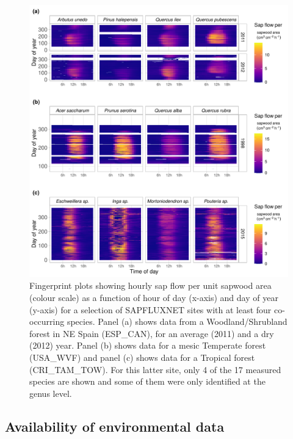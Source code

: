 \documentclass[11pt,twoside]{reedthesis}
\begin{document}
\setlength{\abovecaptionskip}{0pt}
\begin{figure}[hbt!]

{\centering \includegraphics[width=1\linewidth]{figure/CH3/Figure7} 

}

\caption[Fingerprint plots showing hourly sap flow per unit sapwood area.]{Fingerprint plots showing hourly sap flow per unit sapwood area (colour scale) as a function of hour of day (x-axis) and day of year (y-axis) for a selection of SAPFLUXNET sites with at least four co-occurring species. Panel (a) shows data from a Woodland/Shrubland forest in NE Spain (ESP\_CAN), for an average (2011) and a dry (2012) year. Panel (b) shows data for a mesic Temperate forest (USA\_WVF) and panel (c) shows data for a Tropical forest (CRI\_TAM\_TOW). For this latter site, only 4 of the 17 measured species are shown and some of them were only identified at the genus level.}\label{fig:Ch2plot7}
\end{figure}
\subsection{Availability of environmental
data}\label{availability-of-environmental-data}
\end{document}
